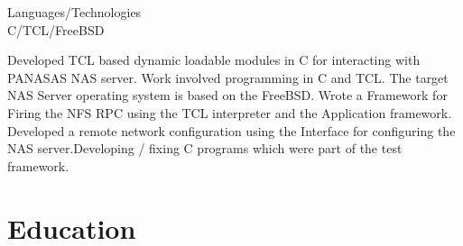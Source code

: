 \documentclass[a4,11pt]{cv4tw}
\begin{document}
{Languages/Technologies \\ C/TCL/FreeBSD}
	{ 
	\begin{missions}		
		\item Developed TCL based dynamic loadable modules in C for interacting with PANASAS NAS server. Work involved programming in C and TCL. The target NAS Server operating system is based on the FreeBSD. Wrote a Framework for Firing the NFS RPC using the TCL interpreter and the Application framework. Developed a remote network configuration using the  Interface for configuring the NAS server.Developing / fixing C programs which were part of the test framework.
	\end{missions}	
}	


\section{Education}

\end{document}
